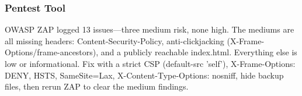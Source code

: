 \subsubsection{Pentest Tool}

OWASP ZAP \cite{zaproxy} logged 13 issues—three medium risk, none high.
The mediums are all missing headers: Content-Security-Policy, anti-clickjacking (X-Frame-Options/frame-ancestors), and a publicly reachable index.html.
Everything else is low or informational.
Fix with a strict CSP (default-src 'self'), X-Frame-Options: DENY, HSTS, SameSite=Lax, X-Content-Type-Options: nosniff, hide backup files, then rerun ZAP to clear the medium findings.